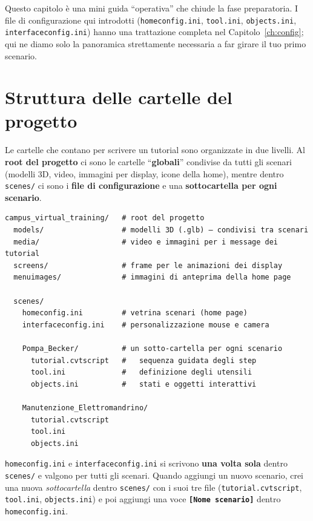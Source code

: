 ﻿\documentclass[a4paper,12pt,oneside]{book}
\newcommand{\sez}[1]{\texttt{\color{sectioncolor}\textbf{#1}}}
\newcommand{\file}[1]{\texttt{#1}}
\begin{document}
Questo capitolo è una mini guida ``operativa'' che chiude la fase
preparatoria. I file di configurazione qui introdotti
(\file{homeconfig.ini}, \file{tool.ini}, \file{objects.ini},
\file{interfaceconfig.ini}) hanno una trattazione completa nel
Capitolo~\ref{ch:config}; qui ne diamo solo la panoramica strettamente
necessaria a far girare il tuo primo scenario.

\section{Struttura delle cartelle del progetto}

Le cartelle che contano per scrivere un tutorial sono organizzate in due
livelli. Al \textbf{root del progetto} ci sono le cartelle ``\textbf{globali}''
condivise da tutti gli scenari (modelli 3D, video, immagini per display,
icone della home), mentre dentro \file{scenes/} ci sono i \textbf{file di
configurazione} e una \textbf{sottocartella per ogni scenario}.

\begin{lstlisting}
campus_virtual_training/   # root del progetto
  models/                  # modelli 3D (.glb) — condivisi tra scenari
  media/                   # video e immagini per i message dei tutorial
  screens/                 # frame per le animazioni dei display
  menuimages/              # immagini di anteprima della home page

  scenes/
    homeconfig.ini         # vetrina scenari (home page)
    interfaceconfig.ini    # personalizzazione mouse e camera

    Pompa_Becker/          # un sotto-cartella per ogni scenario
      tutorial.cvtscript   #   sequenza guidata degli step
      tool.ini             #   definizione degli utensili
      objects.ini          #   stati e oggetti interattivi

    Manutenzione_Elettromandrino/
      tutorial.cvtscript
      tool.ini
      objects.ini
\end{lstlisting}

\begin{notablu}
\file{homeconfig.ini} e \file{interfaceconfig.ini} si scrivono \textbf{una
volta sola} dentro \file{scenes/} e valgono per tutti gli scenari. Quando
aggiungi un nuovo scenario, crei una nuova \emph{sottocartella} dentro
\file{scenes/} con i suoi tre file (\file{tutorial.cvtscript},
\file{tool.ini}, \file{objects.ini}) e poi aggiungi una voce
\sez{[Nome scenario]} dentro \file{homeconfig.ini}.
\end{notablu}
\end{document}
